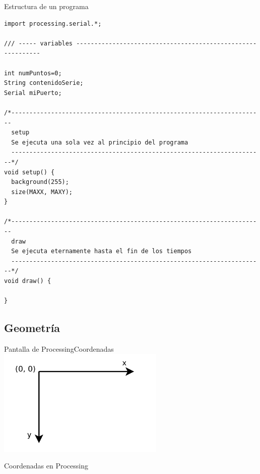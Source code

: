 \begin{frame}[fragile]{Estructura de un programa}
  \begin{lstlisting}
import processing.serial.*;

/// ----- variables ------------------------------------------------------------

int numPuntos=0;
String contenidoSerie;
Serial miPuerto;

/*----------------------------------------------------------------------
  setup
  Se ejecuta una sola vez al principio del programa
  ----------------------------------------------------------------------*/
void setup() {   
  background(255);
  size(MAXX, MAXY); 
}

/*----------------------------------------------------------------------
  draw
  Se ejecuta eternamente hasta el fin de los tiempos
  ----------------------------------------------------------------------*/
void draw() { 

}
  \end{lstlisting}
\end{frame}

\subsection{Geometría}

\begin{frame}{Pantalla de Processing}{Coordenadas}
  \includegraphics [width=0.6\textwidth]{xyProcessing.png}

  Coordenadas en Processing
\end{frame}

